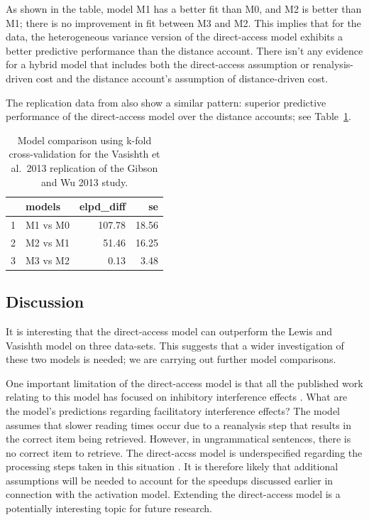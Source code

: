 \documentclass{cambridge7A}\usepackage[]{graphicx}\usepackage[]{color}
\begin{document}
As shown in the table, model M1 has  a better fit than M0, and M2 is better than M1; there is no improvement in fit between M3 and M2. This implies that for the \cite{gibsonwu} data, the heterogeneous variance version of the direct-access model exhibits a better predictive performance than the distance account. There isn't any evidence for a hybrid model that includes both the direct-access assumption or renalysis-driven cost and the distance account's assumption of distance-driven cost.

The replication data from \cite{VasishthetalPLoSOne2013} also show a similar pattern: superior predictive performance of the direct-access model over the distance accounts; see Table~\ref{tab:modcompgibsonwurep}. 

\begin{table}[!htbp]
\centering
\begin{tabular}{rlrr}
  \hline
 & models & elpd\_diff & se \\ 
  \hline
1 & M1 vs M0 & 107.78 & 18.56 \\ 
  2 & M2 vs M1 & 51.46 & 16.25 \\
  3 & M3 vs M2 & 0.13 & 3.48 \\
   \hline
\end{tabular}
\caption{Model comparison using k-fold cross-validation for the Vasishth et al.\ 2013 replication of the Gibson and Wu 2013 study.} 
\label{tab:modcompgibsonwurep}
\end{table}


\subsection{Discussion}

It is interesting that the direct-access model can outperform the Lewis and Vasishth model on three data-sets. This suggests that a wider investigation of these two models is needed; we are carrying out further model comparisons.

One important limitation of the direct-access model is that all the published work relating to this model has focused on inhibitory interference effects \citep{VasishthEtAlTiCS2019}. What are the model's predictions regarding facilitatory interference effects? The model assumes that slower reading times occur due to a reanalysis step that results in the correct item being retrieved. However, in ungrammatical sentences, there is no correct item to retrieve. The direct-accss model is underspecified regarding the processing steps taken in this situation \citep{NicenboimRetrieval2018}. It is therefore likely that additional assumptions will be needed to account for the speedups discussed earlier in connection with the activation model. Extending the direct-access model is a potentially interesting topic for future research.
\end{document}
